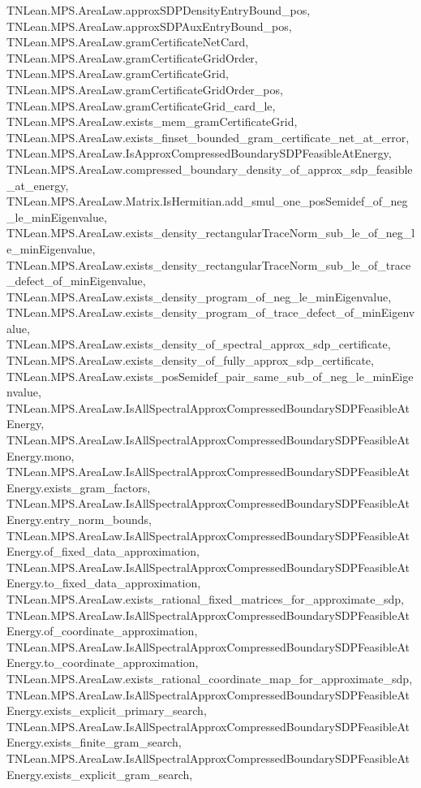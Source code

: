 \begin{lemma}
{        TNLean.MPS.AreaLaw.approxSDPDensityEntryBound_pos,
        TNLean.MPS.AreaLaw.approxSDPAuxEntryBound_pos,
        TNLean.MPS.AreaLaw.gramCertificateNetCard,
        TNLean.MPS.AreaLaw.gramCertificateGridOrder,
        TNLean.MPS.AreaLaw.gramCertificateGrid,
        TNLean.MPS.AreaLaw.gramCertificateGridOrder_pos,
        TNLean.MPS.AreaLaw.gramCertificateGrid_card_le,
        TNLean.MPS.AreaLaw.exists_mem_gramCertificateGrid,
        TNLean.MPS.AreaLaw.exists_finset_bounded_gram_certificate_net_at_error,
        TNLean.MPS.AreaLaw.IsApproxCompressedBoundarySDPFeasibleAtEnergy,
        TNLean.MPS.AreaLaw.compressed_boundary_density_of_approx_sdp_feasible_at_energy,
        TNLean.MPS.AreaLaw.Matrix.IsHermitian.add_smul_one_posSemidef_of_neg_le_minEigenvalue,
        TNLean.MPS.AreaLaw.exists_density_rectangularTraceNorm_sub_le_of_neg_le_minEigenvalue,
        TNLean.MPS.AreaLaw.exists_density_rectangularTraceNorm_sub_le_of_trace_defect_of_minEigenvalue,
        TNLean.MPS.AreaLaw.exists_density_program_of_neg_le_minEigenvalue,
        TNLean.MPS.AreaLaw.exists_density_program_of_trace_defect_of_minEigenvalue,
        TNLean.MPS.AreaLaw.exists_density_of_spectral_approx_sdp_certificate,
        TNLean.MPS.AreaLaw.exists_density_of_fully_approx_sdp_certificate,
        TNLean.MPS.AreaLaw.exists_posSemidef_pair_same_sub_of_neg_le_minEigenvalue,
        TNLean.MPS.AreaLaw.IsAllSpectralApproxCompressedBoundarySDPFeasibleAtEnergy,
        TNLean.MPS.AreaLaw.IsAllSpectralApproxCompressedBoundarySDPFeasibleAtEnergy.mono,
        TNLean.MPS.AreaLaw.IsAllSpectralApproxCompressedBoundarySDPFeasibleAtEnergy.exists_gram_factors,
        TNLean.MPS.AreaLaw.IsAllSpectralApproxCompressedBoundarySDPFeasibleAtEnergy.entry_norm_bounds,
        TNLean.MPS.AreaLaw.IsAllSpectralApproxCompressedBoundarySDPFeasibleAtEnergy.of_fixed_data_approximation,
        TNLean.MPS.AreaLaw.IsAllSpectralApproxCompressedBoundarySDPFeasibleAtEnergy.to_fixed_data_approximation,
        TNLean.MPS.AreaLaw.exists_rational_fixed_matrices_for_approximate_sdp,
        TNLean.MPS.AreaLaw.IsAllSpectralApproxCompressedBoundarySDPFeasibleAtEnergy.of_coordinate_approximation,
        TNLean.MPS.AreaLaw.IsAllSpectralApproxCompressedBoundarySDPFeasibleAtEnergy.to_coordinate_approximation,
        TNLean.MPS.AreaLaw.exists_rational_coordinate_map_for_approximate_sdp,
        TNLean.MPS.AreaLaw.IsAllSpectralApproxCompressedBoundarySDPFeasibleAtEnergy.exists_explicit_primary_search,
        TNLean.MPS.AreaLaw.IsAllSpectralApproxCompressedBoundarySDPFeasibleAtEnergy.exists_finite_gram_search,
        TNLean.MPS.AreaLaw.IsAllSpectralApproxCompressedBoundarySDPFeasibleAtEnergy.exists_explicit_gram_search,
}
\end{lemma}
